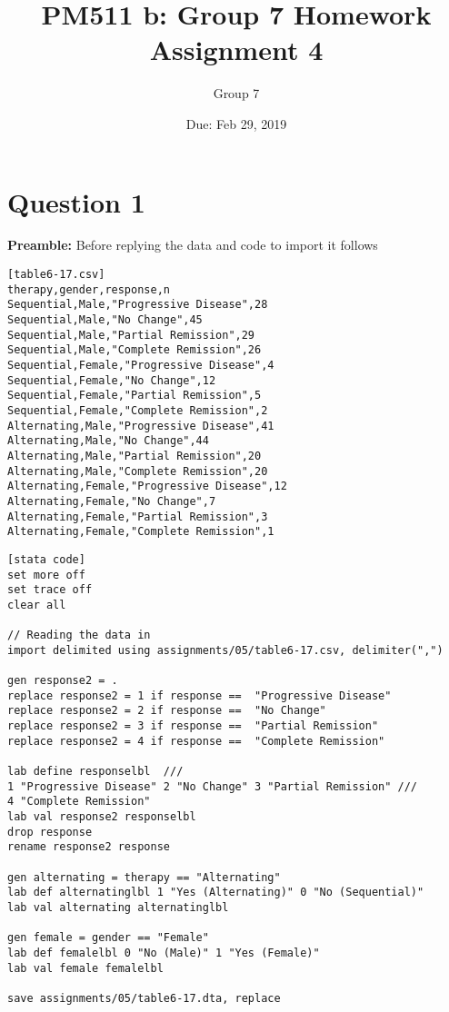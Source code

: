 \documentclass{article}
\title{PM511 b: Group 7 Homework Assignment 4}
\author{Group 7}
\date{Due: Feb 29, 2019}
\begin{document}
\selectfont

\maketitle

\section{Question 1}

\textbf{Preamble:} Before replying the data and code to import it follows



\begin{verbatim}[table6-17.csv]
therapy,gender,response,n
Sequential,Male,"Progressive Disease",28
Sequential,Male,"No Change",45
Sequential,Male,"Partial Remission",29
Sequential,Male,"Complete Remission",26
Sequential,Female,"Progressive Disease",4
Sequential,Female,"No Change",12
Sequential,Female,"Partial Remission",5
Sequential,Female,"Complete Remission",2
Alternating,Male,"Progressive Disease",41
Alternating,Male,"No Change",44
Alternating,Male,"Partial Remission",20
Alternating,Male,"Complete Remission",20
Alternating,Female,"Progressive Disease",12
Alternating,Female,"No Change",7
Alternating,Female,"Partial Remission",3
Alternating,Female,"Complete Remission",1
\end{verbatim}

\begin{verbatim}[stata code]
set more off
set trace off
clear all

// Reading the data in
import delimited using assignments/05/table6-17.csv, delimiter(",")

gen response2 = .
replace response2 = 1 if response ==  "Progressive Disease"
replace response2 = 2 if response ==  "No Change"
replace response2 = 3 if response ==  "Partial Remission"
replace response2 = 4 if response ==  "Complete Remission"

lab define responselbl  ///
1 "Progressive Disease" 2 "No Change" 3 "Partial Remission" ///
4 "Complete Remission"
lab val response2 responselbl
drop response
rename response2 response

gen alternating = therapy == "Alternating"
lab def alternatinglbl 1 "Yes (Alternating)" 0 "No (Sequential)"
lab val alternating alternatinglbl

gen female = gender == "Female"
lab def femalelbl 0 "No (Male)" 1 "Yes (Female)"
lab val female femalelbl

save assignments/05/table6-17.dta, replace
\end{verbatim}
\end{document}
